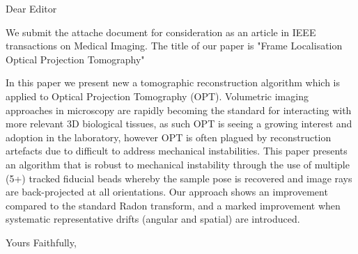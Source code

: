 \documentclass{letter}
\begin{document}
\begin{letter}{}
\opening{Dear Editor}

We submit the attache document for consideration as an article in IEEE transactions on Medical Imaging. The title of our paper is "Frame Localisation Optical Projection
Tomography"

In this paper we present new a tomographic reconstruction algorithm which is applied to Optical Projection Tomography (OPT). Volumetric imaging approaches in microscopy are rapidly becoming the standard for interacting with more relevant 3D biological tissues, as such OPT is seeing a growing interest and adoption in the laboratory, however OPT is often plagued by reconstruction artefacts due to difficult to address mechanical instabilities. This paper presents an algorithm that is robust to mechanical instability through the use of multiple (5+) tracked fiducial beads whereby the sample pose is recovered and image rays are back-projected at all orientations. Our approach shows an improvement compared to the standard Radon transform, and a marked improvement when systematic representative drifts (angular and spatial) are introduced.

%
%
%

%

\closing{Yours Faithfully,}

%
%

\end{letter}
\end{document}

